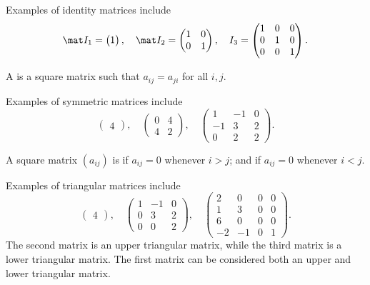 \begin{example}
    Examples of identity matrices include \[\mat I_1 = \begin{pmatrix}1\end{pmatrix}, \quad \mat I_2 = \begin{pmatrix}1 & 0 \\ 0 & 1\end{pmatrix}, \quad I_3 = \begin{pmatrix}1 & 0 & 0 \\ 0 & 1 & 0 \\ 0 & 0 & 1\end{pmatrix}.\]
\end{example}

\begin{definition}
    A  is a square matrix such that $a_{ij} = a_{ji}$ for all $i, j$.
\end{definition}

\begin{example}
    Examples of symmetric matrices include \[\begin{pmatrix}4\end{pmatrix}, \quad \begin{pmatrix}0 & 4 \\ 4 & 2\end{pmatrix}, \quad \begin{pmatrix}1 & -1 & 0 \\ -1 & 3 & 2 \\ 0 & 2 & 2\end{pmatrix}.\]
\end{example}

\begin{definition}
    A square matrix $(a_{ij})$ is  if $a_{ij} = 0$ whenever $i > j$; and  if $a_{ij} = 0$ whenever $i < j$.
\end{definition}

\begin{example}
    Examples of triangular matrices include \[\begin{pmatrix}4\end{pmatrix}, \quad \begin{pmatrix}1 & -1 & 0 \\ 0 & 3 & 2 \\ 0 & 0 & 2\end{pmatrix}, \quad \begin{pmatrix}2 & 0 & 0 & 0 \\ 1 & 3 & 0 & 0 \\ 6 & 0 & 0 & 0 \\ -2 & -1 & 0 & 1\end{pmatrix}.\] The second matrix is an upper triangular matrix, while the third matrix is a lower triangular matrix. The first matrix can be considered both an upper and lower triangular matrix.
\end{example}

